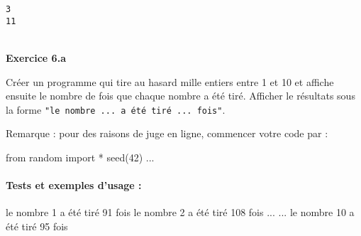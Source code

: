 \documentclass[a4paper,17pt]{extarticle}
\newenvironment{eleve}%
{\begin{activite}\color{noiramu}\\[-0.5cm]}
{\end{activite}}
\newenvironment{Shaded}{}{}
\newcommand{\DecValTok}[1]{\textcolor[rgb]{0.25,0.63,0.44}{{#1}}}
\newcommand{\NormalTok}[1]{{#1}}
\newcommand{\ImportTok}[1]{{#1}}
\newcommand{\OperatorTok}[1]{\textcolor[rgb]{0.40,0.40,0.40}{{#1}}}
\begin{document}
    \begin{Verbatim}[commandchars=\\\{\}]
3
11
    \end{Verbatim}
\begin{eleve}
    \textbf{Exercice 6.a}

Créer un programme qui tire au hasard mille entiers entre 1 et 10 et
affiche ensuite le nombre de fois que chaque nombre a été tiré. Afficher
le résultats sous la forme
\texttt{"le\ nombre\ ...\ a\ été\ tiré\ ...\ fois"}.

Remarque : pour des raisons de juge en ligne, commencer votre code par :

\begin{Shaded}
\begin{Highlighting}[]
\ImportTok{from}\NormalTok{ random }\ImportTok{import} \OperatorTok{*}
\NormalTok{seed(}\DecValTok{42}\NormalTok{)}
\NormalTok{...}
\end{Highlighting}
\end{Shaded}

\hypertarget{tests-et-exemples-dusage}{%
\paragraph{Tests et exemples d'usage :}\label{tests-et-exemples-dusage}}

\begin{Shaded}
\begin{Highlighting}[]
\NormalTok{le nombre }\DecValTok{1}\NormalTok{ a été tiré }\DecValTok{91}\NormalTok{ fois}
\NormalTok{le nombre }\DecValTok{2}\NormalTok{ a été tiré }\DecValTok{108}\NormalTok{ fois}
\NormalTok{...}
\NormalTok{...}
\NormalTok{le nombre }\DecValTok{10}\NormalTok{ a été tiré }\DecValTok{95}\NormalTok{ fois}
\end{Highlighting}
\end{Shaded}
        
        \end{eleve}
\end{document}
